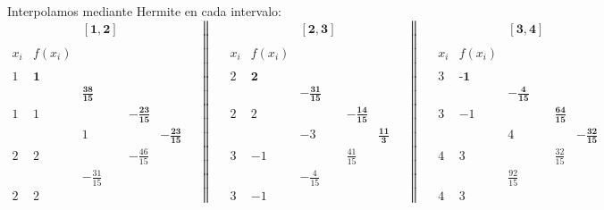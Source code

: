 \begin{ejercicio}
    Interpolamos mediante Hermite en cada intervalo:
    \begin{equation*}
        \begin{array}{c|cccc}
            &&\mathbf{[1,2]} \\ \\
            x_i & f(x_i) \\ \\
            1 & \textbf{1} \\
            && \mathbf{\frac{38}{15}}\\
            1 & 1 && \mathbf{-\frac{23}{15}}\\
            && 1 && -\mathbf{\frac{23}{15}}\\ 
            2 & 2 && -\frac{46}{15}\\
            && -\frac{31}{15}\\
            2 & 2
        \end{array}
        \quad \left\|\quad
        \begin{array}{c|cccc}
            &&\mathbf{[2,3]} \\ \\
            x_i & f(x_i) \\ \\
            2 & \textbf{2} \\
            && \mathbf{-\frac{31}{15}}\\
            2 & 2 && \mathbf{-\frac{14}{15}}\\
            && -3 && \mathbf{\frac{11}{3}}\\ 
            3 & -1 && \frac{41}{15}\\
            && -\frac{4}{15}\\
            3 & -1
        \end{array}\right.
        \quad \left\|\quad
        \begin{array}{c|cccc}
            &&\mathbf{[3, 4]} \\ \\
            x_i & f(x_i) \\ \\
            3 & \textbf{-1} \\
            && \mathbf{-\frac{4}{15}}\\
            3 & -1 && \mathbf{\frac{64}{15}}\\
            && 4 && \mathbf{-\frac{32}{15}}\\ 
            4 & 3 && \frac{32}{15}\\
            && \frac{92}{15}\\
            4 & 3
        \end{array}\right.
    \end{equation*}


\end{ejercicio}
